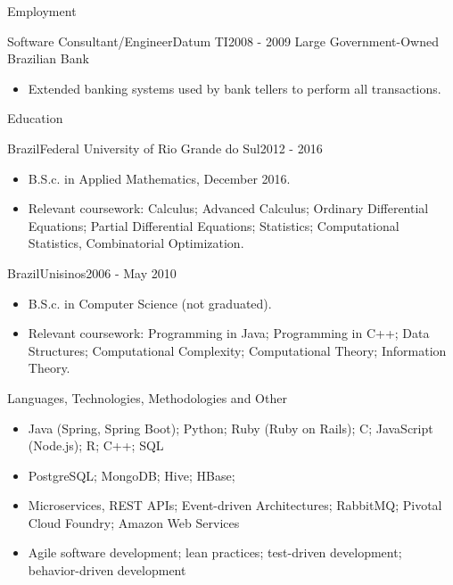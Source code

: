 \documentclass[]{customresume}
\begin{document}
\begin{cvsection}{Employment}
		\begin{cvsubsection}{Software Consultant/Engineer}{Datum TI}{2008 - 2009}
      Large Government-Owned Brazilian Bank
			\begin{itemize}
        \item Extended banking systems used by bank tellers to perform all transactions.
			\end{itemize}
		\end{cvsubsection}
	\end{cvsection}
	
	\begin{cvsection}{Education}
		\begin{cvsubsection}{Brazil}{Federal University of Rio Grande do Sul}{2012 - 2016}
			\begin{itemize}
				\item B.S.c. in Applied Mathematics, December 2016.
				\item Relevant coursework: Calculus; Advanced Calculus; Ordinary Differential Equations; Partial Differential Equations; Statistics; 
          Computational Statistics, Combinatorial Optimization.
			\end{itemize}
		\end{cvsubsection}
		\begin{cvsubsection}{Brazil}{Unisinos}{2006 - May 2010}
			\begin{itemize}
        \item B.S.c. in Computer Science (not graduated).
        \item Relevant coursework: Programming in Java; Programming in C++; Data Structures; Computational Complexity; Computational Theory; Information Theory.
			\end{itemize}
		\end{cvsubsection}
	\end{cvsection}

	\begin{cvsection}{Languages, Technologies, Methodologies and Other}
		\begin{cvsubsection}{}{}{}	
			\begin{itemize}
        \item Java (Spring, Spring Boot); Python; Ruby (Ruby on Rails); C; JavaScript (Node.js); R; C++; SQL
        \item PostgreSQL; MongoDB; Hive; HBase;
        \item Microservices, REST APIs; Event-driven Architectures; RabbitMQ; Pivotal Cloud Foundry; Amazon Web Services
        \item Agile software development; lean practices; test-driven development; behavior-driven development
			\end{itemize}
		\end{cvsubsection}
	\end{cvsection}
	
\end{document}
